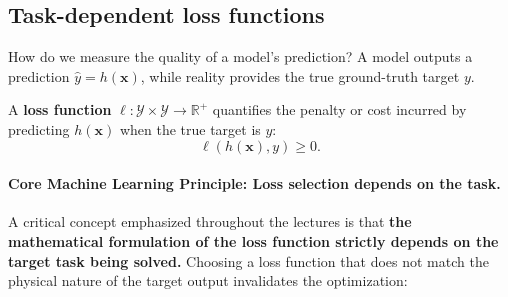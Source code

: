 \subsection{Task-dependent loss functions}
\label{sec:task_dependent_losses}

How do we measure the quality of a model's prediction? A model outputs a prediction $\hat{y} = h(\mathbf{x})$, while reality provides the true ground-truth target $y$. 

A \textbf{loss function} $\ell: \mathcal{Y} \times \mathcal{Y} \to \mathbb{R}^+$ quantifies the penalty or cost incurred by predicting $h(\mathbf{x})$ when the true target is $y$:
\begin{equation}
\ell(h(\mathbf{x}), y) \ge 0.
\end{equation}

\paragraph{Core Machine Learning Principle: Loss selection depends on the task.}
A critical concept emphasized throughout the lectures is that \textbf{the mathematical formulation of the loss function strictly depends on the target task being solved.} Choosing a loss function that does not match the physical nature of the target output invalidates the optimization:
